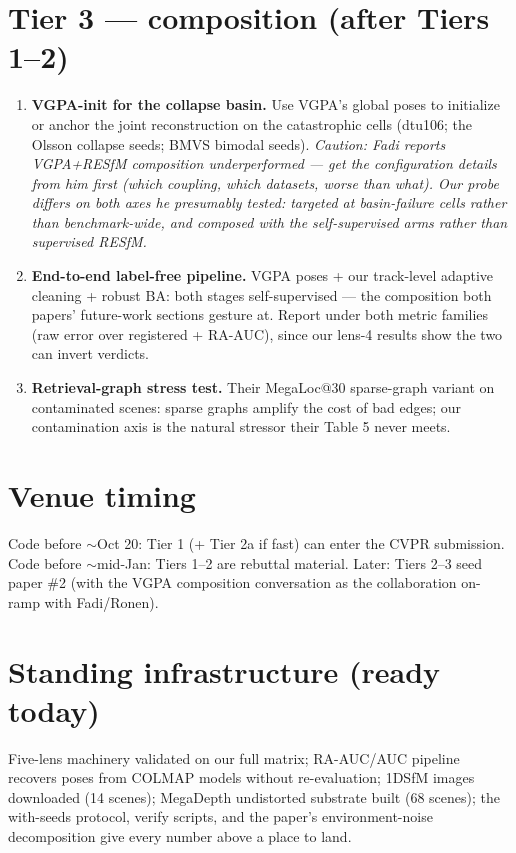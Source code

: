 \documentclass[11pt]{article}
\begin{document}
\section*{Tier 3 --- composition (after Tiers 1--2)}
\begin{enumerate}[leftmargin=1.6em,itemsep=4pt,resume]
\item \textbf{VGPA-init for the collapse basin.} Use VGPA's global poses to initialize
or anchor the joint reconstruction on the catastrophic cells (dtu106; the Olsson
collapse seeds; BMVS bimodal seeds). \emph{Caution: Fadi reports VGPA+RESfM composition
underperformed --- get the configuration details from him first (which coupling, which
datasets, worse than what). Our probe differs on both axes he presumably tested:
targeted at basin-failure cells rather than benchmark-wide, and composed with the
self-supervised arms rather than supervised RESfM.}
\item \textbf{End-to-end label-free pipeline.} VGPA poses + our track-level adaptive
cleaning + robust BA: both stages self-supervised --- the composition both papers'
future-work sections gesture at. Report under both metric families (raw error over
registered + RA-AUC), since our lens-4 results show the two can invert verdicts.
\item \textbf{Retrieval-graph stress test.} Their MegaLoc@30 sparse-graph variant on
contaminated scenes: sparse graphs amplify the cost of bad edges; our contamination
axis is the natural stressor their Table 5 never meets.
\end{enumerate}

\section*{Venue timing}
Code before $\sim$Oct 20: Tier 1 (+ Tier 2a if fast) can enter the CVPR submission.
Code before $\sim$mid-Jan: Tiers 1--2 are rebuttal material. Later: Tiers 2--3 seed
paper \#2 (with the VGPA composition conversation as the collaboration on-ramp with
Fadi/Ronen).

\section*{Standing infrastructure (ready today)}
Five-lens machinery validated on our full matrix; RA-AUC/AUC pipeline recovers poses
from COLMAP models without re-evaluation; 1DSfM images downloaded (14 scenes);
MegaDepth undistorted substrate built (68 scenes); the with-seeds protocol, verify
scripts, and the paper's environment-noise decomposition give every number above a
place to land.
\end{document}
